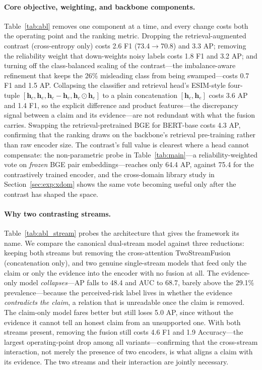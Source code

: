 \documentclass[11pt]{article}
\begin{document}
\paragraph{Core objective, weighting, and backbone components.}
Table~\ref{tab:abl} removes one component at a time, and every change costs both
the operating point and the ranking metric. Dropping the retrieval-augmented
contrast (cross-entropy only) costs 2.6 F1 (73.4$\to$70.8) and 3.3 AP; removing the
reliability weight that down-weights noisy labels costs 1.8 F1 and 3.2 AP; and
turning off the class-balanced scaling of the contrast---the imbalance-aware
refinement that keeps the 26\% misleading class from being swamped---costs 0.7 F1
and 1.5 AP. Collapsing the classifier and retrieval head's ESIM-style four-tuple
$[\mathbf{h}_c,\mathbf{h}_e,\mathbf{h}_c-\mathbf{h}_e,\mathbf{h}_c\odot\mathbf{h}_e]$
to a plain concatenation $[\mathbf{h}_c,\mathbf{h}_e]$ costs 3.6 AP and 1.4 F1, so
the explicit difference and product features---the discrepancy signal between a
claim and its evidence---are not redundant with what the fusion carries. Swapping
the retrieval-pretrained BGE for BERT-base costs 4.3 AP, confirming that the
ranking draws on the backbone's retrieval pre-training rather than raw encoder
size. The contrast's full value is clearest where a head cannot compensate: the
non-parametric probe in Table~\ref{tab:main}---a reliability-weighted vote on
\emph{frozen} BGE pair embeddings---reaches only 64.4 AP, against 75.4 for the
contrastively trained encoder, and the cross-domain library study in
Section~\ref{sec:exp:xdom} shows the same vote becoming useful only after the
contrast has shaped the space.

\paragraph{Why two contrasting streams.}
Table~\ref{tab:abl_stream} probes the architecture that gives the framework its
name. We compare the canonical dual-stream model against three reductions: keeping
both streams but removing the cross-attention TwoStreamFusion (concatenation
only), and two genuine single-stream models that feed only the claim or only the
evidence into the encoder with no fusion at all. The evidence-only model
\emph{collapses}---AP falls to 48.4 and AUC to 68.7, barely above the 29.1\%
prevalence---because the perceived-risk label lives in whether the evidence
\emph{contradicts the claim}, a relation that is unreadable once the claim is
removed. The claim-only model fares better but still loses 5.0 AP, since without
the evidence it cannot tell an honest claim from an unsupported one. With both
streams present, removing the fusion still costs 4.6 F1 and 1.9 Accuracy---the
largest operating-point drop among all variants---confirming that the cross-stream
interaction, not merely the presence of two encoders, is what aligns a claim with
its evidence. The two streams and their interaction are jointly necessary.
\end{document}

